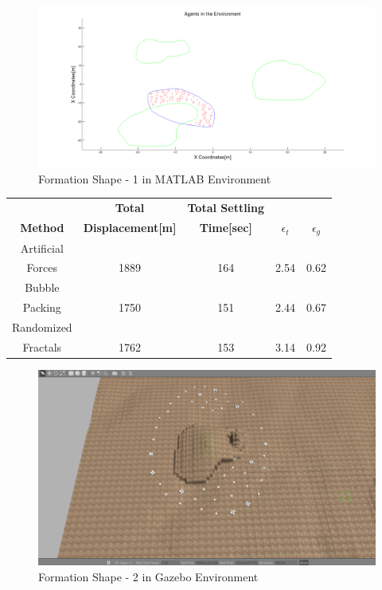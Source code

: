 \begin{figure}[H]
\caption{Formation Shape - 1 in MATLAB Environment}
\centerline{\includegraphics[scale = 0.32]{1}}
\end{figure} 
			
\begin{center}
 \label{perf_shape1} 
\begin{tabular}{|c|c|c|c|c|}
					
\hline
\textbf{} & \textbf{Total}  & \textbf{Total Settling} & \textbf{} & \textbf{} \\ \textbf{Method} & \textbf{Displacement[m]} & \textbf{Time[sec]}& \textbf{$\epsilon_t$} & \textbf{$\epsilon_g$} \\
\hline
Artificial&  &  &  & \\
 Forces & 1889 & 164& 2.54 & 0.62\\
 \hline
 Bubble&  &  &  & \\
 Packing &1750 &151 &2.44 & 0.67\\
\hline
 Randomized&  &  &  & \\
 Fractals &1762 &153 &3.14 & 0.92\\
\hline
\end{tabular}
\end{center}
	
\begin{figure}[H]
\caption{Formation Shape - 2 in Gazebo Environment}
\centerline{\includegraphics[scale = 0.32]{2_Gazebo}}
\end{figure} 
		 
